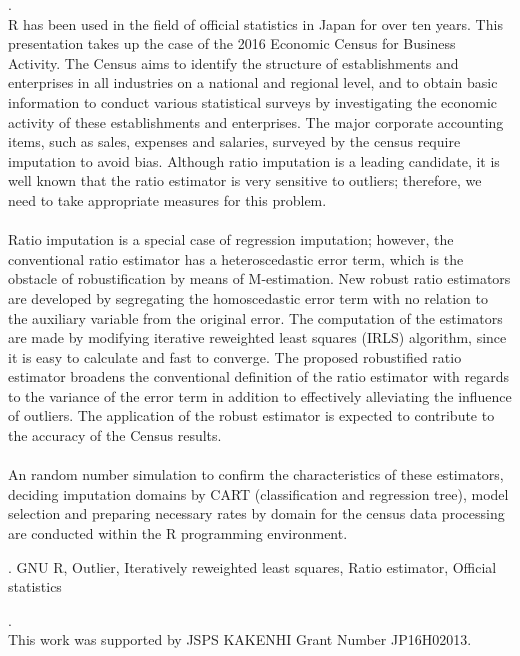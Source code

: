 \documentclass[12pt]{article}
\begin{document}
. \\
R has been used in the field of official statistics in Japan for over ten years.  This presentation takes up the case of the 2016 Economic Census for Business Activity.  The Census aims to identify the structure of establishments and enterprises in all industries on a national and regional level, and to obtain basic information to conduct various statistical surveys by investigating the economic activity of these establishments and enterprises.  The major corporate accounting items, such as sales, expenses and salaries, surveyed by the census require imputation to avoid bias.  Although ratio imputation is a leading candidate, it is well known that the ratio estimator is very sensitive to outliers; therefore, we need to take appropriate measures for this problem. \\
\\
Ratio imputation is a special case of regression imputation; however, the conventional ratio estimator has a heteroscedastic error term, which is the obstacle of robustification by means of M-estimation.  New robust ratio estimators are developed by segregating the homoscedastic error term with no relation to the auxiliary variable from the original error.  The computation of the estimators are made by modifying iterative reweighted least squares (IRLS) algorithm, since it is easy to calculate and fast to converge.  The proposed robustified ratio estimator broadens the conventional definition of the ratio estimator with regards to the variance of the error term in addition to effectively alleviating the influence of outliers.  The application of the robust estimator is expected to contribute to the accuracy of the Census results. \\
\\
An random number simulation to confirm the characteristics of these estimators, deciding imputation domains by CART (classification and regression tree), model selection and preparing necessary rates by domain for the census data processing are conducted within the R programming environment. \\

\vskip 2mm

.
GNU R, Outlier, Iteratively reweighted least squares, Ratio estimator, Official statistics


\vskip 5mm

. \\
This work was supported by JSPS KAKENHI Grant Number JP16H02013.
\end{document}
